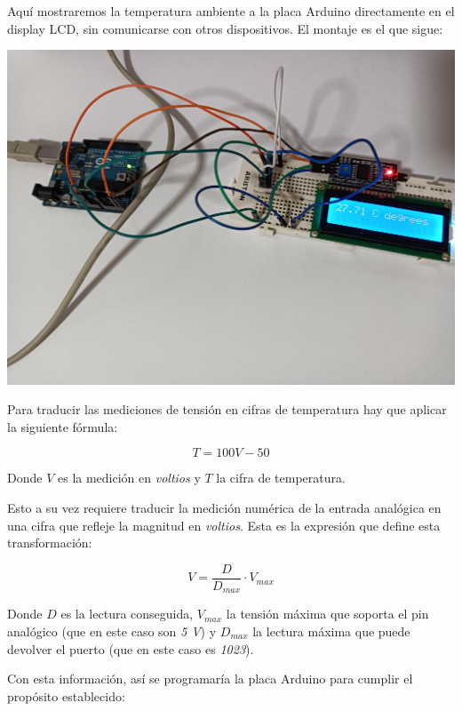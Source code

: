 Aquí mostraremos la temperatura ambiente a la placa Arduino directamente en el
display LCD, sin comunicarse con otros dispositivos. El montaje es el que
sigue:

\includegraphics[width=\linewidth]{temperature-display-wiring.jpg}

Para traducir las mediciones de tensión en cifras de temperatura hay que
aplicar la siguiente fórmula:

\begin{equation*}
T = 100V - 50
\end{equation*}

Donde $V$ es la medición en \emph{voltios} y $T$ la cifra de temperatura.

Esto a su vez requiere traducir la medición numérica de la entrada analógica en
una cifra que refleje la magnitud en \emph{voltios}. Esta es la expresión que
define esta transformación:

\begin{equation*}
V = \frac{D}{D_{max}} \cdot V_{max}
\end{equation*}

Donde $D$ es la lectura conseguida, $V_{max}$ la tensión máxima que soporta el
pin analógico (que en este caso son \emph{5 V}) y $D_{max}$ la lectura máxima
que puede devolver el puerto (que en este caso es \emph{1023}).

Con esta información, así se programaría la placa Arduino para cumplir el
propósito establecido:

